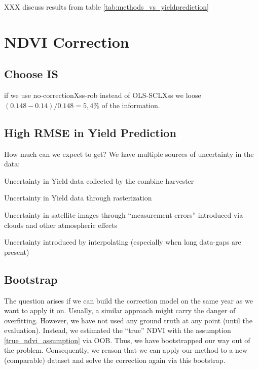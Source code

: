 XXX discuss results from table \ref{tab:methods_vs_yieldprediction}

\section{NDVI Correction}{\label{sec:discussion_corr}
    \subsection{Choose {{IS}}}\label{sec:discussion_iplfstrategy-choose}
        if we use no-correctionXss-rob instead of OLS-SCLXss we loose $(0.148-0.14)/0.148 = 5,4\%$ of the information.
    \subsection{High RMSE in Yield Prediction}{\label{sec:discuss_high-rmse-in-yield-prdiction}
        How much can we expect to get? We have multiple sources of uncertainty in the data:
        \begin{Nenumerate}
            \item Uncertainty in Yield data collected by the combine harvester
            \item Uncertainty in Yield data through rasterization
            \item Uncertainty in satellite images through ``measurement errors'' introduced via clouds and other atmospheric effects 
            \item Uncertainty introduced by interpolating (especially when long data-gaps are present)
        \end{Nenumerate}
    }

    \subsection{Bootstrap}
        The question arises if we can build the correction model on the same year as we want to apply it on. Usually, a similar approach might carry the danger of overfitting. However, we have not used any ground truth at any point (until the evaluation). Instead, we estimated the ``true'' NDVI with the assumption \ref{true_ndvi_assumption} via OOB. Thus, we have bootstrapped our way out of the problem. Consequently, we reason that we can apply our method to a new (comparable) dataset and solve the correction again via this bootstrap.
}
